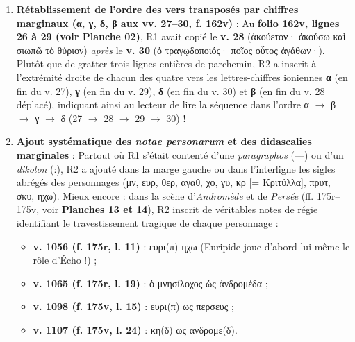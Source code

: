 \documentclass[11pt, a4paper, twoside]{article}
\renewcommand{\_}{\origunderscore\penalty0\relax}
\renewcommand{\texttt}[1]{#1}
\newcommand{\Run}{\textbf{R}\textsuperscript{1}}
\newcommand{\Rdeux}{\textbf{R}\textsuperscript{2}}
\newcommand{\auDessus}[2]{\ensuremath{\overset{\text{#2}}{\text{#1}}}}
\def\Run{R1}%
\def\Rdeux{R2}%
\def\auDessus#1#2{#1(#2)}%
\begin{document}
\begin{enumerate}[leftmargin=1.6em, itemsep=2pt]
  \item \textbf{Rétablissement de l'ordre des vers transposés par chiffres marginaux (\texttt{α, γ, δ, β} aux vv. 27–30, \texttt{f. 162v})} : Au \textbf{folio \texttt{162v}, lignes 26 à 29 (voir Planche 02)}, \Run{} avait copié le \textbf{v. 28} (\texttt{ἀκούετον· ἀκούσω καὶ σιωπῶ τὸ θύριον}) \textit{après} le \textbf{v. 30} (\texttt{ὁ τραγῳδοποιός· ποῖος οὗτος ἀγάθων·}). Plutôt que de gratter trois lignes entières de parchemin, \Rdeux{} a inscrit à l'extrémité droite de chacun des quatre vers les lettres-chiffres ioniennes \textbf{\texttt{α}} (en fin du v. 27), \textbf{\texttt{γ}} (en fin du v. 29), \textbf{\texttt{δ}} (en fin du v. 30) et \textbf{\texttt{β}} (en fin du v. 28 déplacé), indiquant ainsi au lecteur de lire la séquence dans l'ordre α $\to$ β $\to$ γ $\to$ δ (\texttt{27 $\to$ 28 $\to$ 29 $\to$ 30}) !

  \item \textbf{Ajout systématique des \textit{notae personarum} et des didascalies marginales} : Partout où \Run{} s'était contenté d'une \textit{paragraphos} (\texttt{—}) ou d'un \textit{dikolon} (\texttt{:}), \Rdeux{} a ajouté dans la marge gauche ou dans l'interligne les sigles abrégés des personnages (\texttt{μν}, \texttt{ευρ}, \texttt{θερ}, \texttt{αγαθ}, \texttt{χο}, \texttt{γυ}, \texttt{κρ} [= Κριτύλλα], \texttt{πρυτ}, \texttt{σκυ}, \texttt{ηχω}). Mieux encore : dans la scène d'\textit{Andromède} et de \textit{Persée} (\texttt{ff. 175r–175v}, voir \textbf{Planches 13 et 14}), \Rdeux{} inscrit de véritables notes de régie identifiant le travestissement tragique de chaque personnage :
  \begin{itemize}[leftmargin=1.5em, itemsep=2pt]
    \item \textbf{v. 1056 (\texttt{f. 175r}, l. 11)} : \texttt{ευρ\auDessus{ι}{π} ηχω} (Euripide joue d'abord lui-même le rôle d'Écho !) ;
    \item \textbf{v. 1065 (\texttt{f. 175r}, l. 19)} : \texttt{ὁ μνησίλοχος ὡς ἀνδρομέδα} ;
    \item \textbf{v. 1098 (\texttt{f. 175v}, l. 15)} : \texttt{ευρ\auDessus{ι}{π} ως περσευς} ;
    \item \textbf{v. 1107 (\texttt{f. 175v}, l. 24)} : \texttt{κ\auDessus{η}{δ} ως ανδρομ\auDessus{ε}{δ}}.
  \end{itemize}


\end{enumerate}
\end{document}
